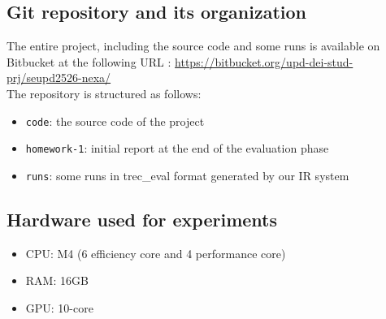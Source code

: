 \subsection{Git repository and its organization}
The entire project, including the source code and some runs is available on Bitbucket at the following URL : \url{https://bitbucket.org/upd-dei-stud-prj/seupd2526-nexa/} \\
The repository is structured as follows:
\begin{itemize}
	\item \texttt{code}: the source code of the project
	\item \texttt{homework-1}: initial report at the end of the evaluation phase
	\item \texttt{runs}: some runs in trec\_eval format generated by our IR system
\end{itemize}

\subsection{Hardware used for experiments}
\begin{itemize}
	\item CPU: M4 (6 efficiency core and 4 performance core)
	\item RAM: 16GB
	\item GPU: 10-core
\end{itemize}
